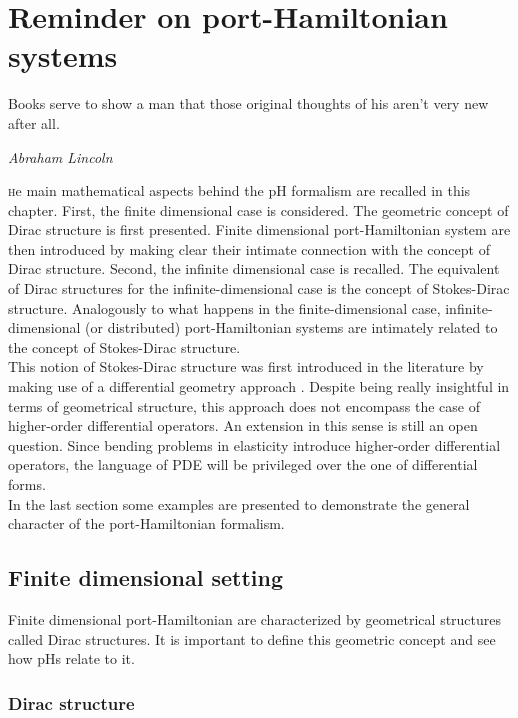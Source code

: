 \chapter{Reminder on port-Hamiltonian systems}\label{ch:reminder}

\epigraph{Books serve to show a man that those original thoughts of his aren't very new after all.}{\textit{Abraham Lincoln}}

\minitoc

\lettrine{\color{theme}{T}}he main mathematical aspects behind the pH formalism are recalled in this chapter. First, the finite dimensional case is considered. The geometric concept of Dirac structure \cite{courant1990} is first presented. Finite dimensional port-Hamiltonian system are then introduced by making clear their intimate connection with the concept of Dirac structure. Second, the infinite dimensional case is recalled. The equivalent of Dirac structures for the infinite-dimensional case is the concept of Stokes-Dirac structure. Analogously to what happens in the finite-dimensional case, infinite-dimensional (or distributed) port-Hamiltonian systems are intimately related to the concept of Stokes-Dirac structure. \\

This notion of Stokes-Dirac structure was first introduced in the literature by making use of a differential geometry approach \cite{vanderschaft2002}. Despite being really insightful in terms of geometrical structure, this approach does not encompass the case of higher-order differential operators. An extension in this sense is still an open question. Since bending problems in elasticity introduce higher-order differential operators, the language of PDE will be privileged over the one of differential forms. \\

In the last section some examples are presented to demonstrate the general character of the port-Hamiltonian formalism. 

 
\section{Finite dimensional setting}

Finite dimensional port-Hamiltonian are characterized by geometrical structures called Dirac structures. It is important to define this geometric concept and see how pHs relate to it. \\

\subsection{Dirac structure}


